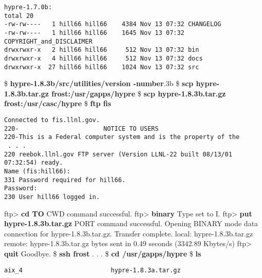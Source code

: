 \begin{ttfamily}
\begin{mdseries}
\begin{verbatim}
hypre-1.7.0b:
total 20
-rw-rw----   1 hill66 hill66    4384 Nov 13 07:32 CHANGELOG
-rw-rw----   1 hill66 hill66    1645 Nov 13 07:32 COPYRIGHT_and_DISCLAIMER
drwxrwxr-x   2 hill66 hill66     512 Nov 13 07:32 bin
drwxrwxr-x   4 hill66 hill66     512 Nov 13 07:32 docs
drwxrwxr-x  27 hill66 hill66    1024 Nov 13 07:32 src
\end{verbatim}
\$ \textbf{hypre-1.8.3b/src/utilities/version -number}.3b\linebreak
\$ \textbf{scp hypre-1.8.3b.tar.gz frost:/usr/gapps/hypre}\linebreak
\$ \textbf{scp hypre-1.8.3b.tar.gz frost:/usr/casc/hypre}\linebreak
\$ \textbf{ftp fis}\linebreak
\begin{verbatim}
Connected to fis.llnl.gov.
220-                       NOTICE TO USERS
220-This is a Federal computer system and is the property of the
 . . .
220 reebok.llnl.gov FTP server (Version LLNL-22 built 08/13/01 07:32:54) ready.
Name (fis:hill66):
331 Password required for hill66.
Password:
230 User hill66 logged in.
\end{verbatim}
ftp> \textbf{cd TO} CWD command successful.\linebreak
ftp> \textbf{binary} Type set to I.\linebreak
ftp> \textbf{put hypre-1.8.3b.tar.gz} PORT command successful. Opening BINARY mode data connection for hypre-1.8.3b.tar.gz. Transfer complete.\linebreak
local: hypre-1.8.3b.tar.gz remote: hypre-1.8.3b.tar.gz bytes sent in 0.49 seconds (3342.89 Kbytes/s)\linebreak
ftp> \textbf{quit} Goodbye.\linebreak
\$ \textbf{ssh frost}\linebreak
 . . .\linebreak
\$ \textbf{cd /usr/gapps/hypre}\linebreak
\$ \textbf{ls}\linebreak
\begin{verbatim}
aix_4                        hypre-1.8.3a.tar.gz

\end{verbatim}
\end{mdseries}
\end{ttfamily}
